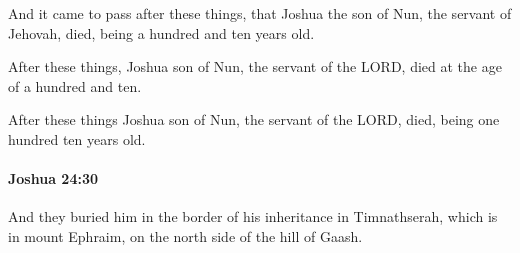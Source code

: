 			\begin{versebox}
					\item[BHS] 
					\item[ASV] And it came to pass after these things, that Joshua the son of Nun, the servant of Jehovah, died, being a hundred and ten years old.
					\item[NIV] After these things, Joshua son of Nun, the servant of the LORD, died at the age of a hundred and ten.
					\item[NRSV] After these things Joshua son of Nun, the servant of the LORD, died, being one hundred ten years old.
			\end{versebox}

		\paragraph{Joshua 24:30} %
			\label{JOSHUA-24-30}

			And they buried him in the border of his inheritance in Timnathserah, which is in mount Ephraim, on the north side of the hill of Gaash.


